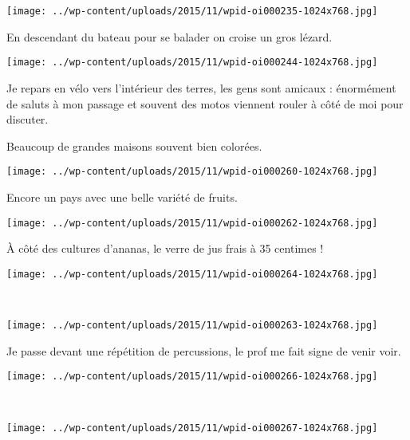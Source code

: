 \begin{center} \texttt{[image: ../wp-content/uploads/2015/11/wpid-oi000235-1024x768.jpg]} \end{center}

  En descendant du bateau pour se balader on croise un gros lézard. 
\begin{center} \texttt{[image: ../wp-content/uploads/2015/11/wpid-oi000244-1024x768.jpg]} \end{center}

 Je repars en vélo vers l'intérieur des terres, les gens sont amicaux : énormément de saluts à mon passage et souvent des motos viennent rouler à côté de moi pour discuter. 

\pagebreak
 Beaucoup de grandes maisons souvent bien colorées. 
\begin{center} \texttt{[image: ../wp-content/uploads/2015/11/wpid-oi000260-1024x768.jpg]} \end{center}

 Encore un pays avec une belle variété de fruits. 
\begin{center} \texttt{[image: ../wp-content/uploads/2015/11/wpid-oi000262-1024x768.jpg]} \end{center}
\vspace{-\topsep}
\pagebreak

  \`A côté des cultures d'ananas, le verre de jus frais à 35 centimes ! 
\begin{center} \texttt{[image: ../wp-content/uploads/2015/11/wpid-oi000264-1024x768.jpg]} \end{center}
~
\begin{center} \texttt{[image: ../wp-content/uploads/2015/11/wpid-oi000263-1024x768.jpg]} \end{center}
\vspace{-\topsep}
\pagebreak
 
 Je passe devant une répétition de percussions, le prof me fait signe de venir voir. 
\begin{center} \texttt{[image: ../wp-content/uploads/2015/11/wpid-oi000266-1024x768.jpg]} \end{center}
~
\begin{center} \texttt{[image: ../wp-content/uploads/2015/11/wpid-oi000267-1024x768.jpg]} \end{center}
\vspace{-\topsep}
\pagebreak

